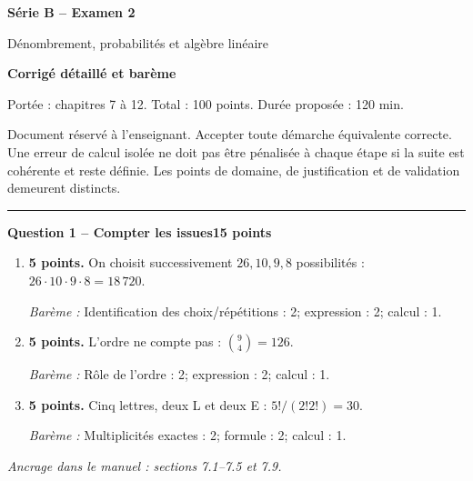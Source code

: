 \documentclass[11pt,a4paper]{article}
\begin{document}
{\LARGE\bfseries Série B -- Examen 2}\par
{\large Dénombrement, probabilités et algèbre linéaire}\par
\textbf{Corrigé détaillé et barème}\par
Portée : chapitres 7 à 12. Total : 100 points. Durée proposée : 120 min.\par
\small Document réservé à l’enseignant. Accepter toute démarche équivalente correcte. Une erreur de calcul isolée ne doit pas être pénalisée à chaque étape si la suite est cohérente et reste définie. Les points de domaine, de justification et de validation demeurent distincts.\normalsize\par
\vspace{3mm}\hrule\vspace{4mm}
{\large\bfseries Question 1 -- Compter les issues}\hfill\textbf{15 points}\par
\begin{enumerate}
\item \textbf{5 points.} On choisit successivement \(26,10,9,8\) possibilités : \(26\cdot10\cdot9\cdot8=18\,720\).
\par{\small\textit{Barème : }Identification des choix/répétitions : 2; expression : 2; calcul : 1.}
\item \textbf{5 points.} L’ordre ne compte pas : \(\binom94=126\).
\par{\small\textit{Barème : }Rôle de l’ordre : 2; expression : 2; calcul : 1.}
\item \textbf{5 points.} Cinq lettres, deux L et deux E : \(5!/(2!2!)=30\).
\par{\small\textit{Barème : }Multiplicités exactes : 2; formule : 2; calcul : 1.}
\end{enumerate}
\vfill {\small\textit{Ancrage dans le manuel : sections 7.1--7.5 et 7.9.}}
\end{document}
